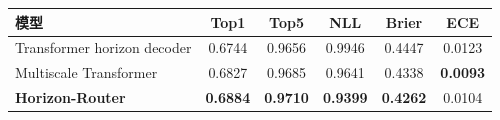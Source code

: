 \begin{tabular}{lccccc}
\toprule
模型 & Top1 & Top5 & NLL & Brier & ECE \\
\midrule
Transformer horizon decoder & 0.6744 & 0.9656 & 0.9946 & 0.4447 & 0.0123 \\
Multiscale Transformer & 0.6827 & 0.9685 & 0.9641 & 0.4338 & \textbf{0.0093} \\
\textbf{Horizon-Router} & \textbf{0.6884} & \textbf{0.9710} & \textbf{0.9399} & \textbf{0.4262} & 0.0104 \\
\bottomrule
\end{tabular}
